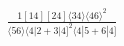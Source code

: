 \documentclass[varwidth, border=5pt]{standalone}
\begin{document}
\begin{my}
$\begin{gathered}
\scriptscriptstyle\frac{1[14][24]⟨34⟩⟨46⟩^2}{⟨56⟩⟨4|2+3|4]^2⟨4|5+6|4]}
\end{gathered}$
\end{my}
\end{document}
